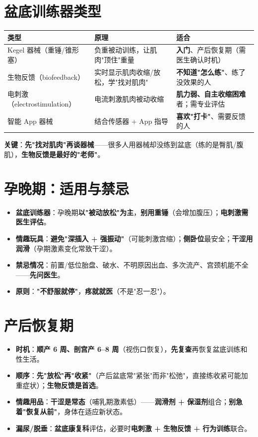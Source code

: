 \section{盆底训练器类型}
\begin{tabularx}{\textwidth}{X X X}
\toprule
\textbf{类型} & \textbf{原理} & \textbf{适合} \\
\midrule
Kegel 器械（重锤/锥形塞） & 负重被动训练，让肌肉"顶住"重量 & \textbf{入门}、产后恢复期（需医生确认时机） \\
生物反馈（biofeedback） & 实时显示肌肉收缩/放松，学"找对肌肉" & \textbf{不知道"怎么练"}、练了没效果的人 \\
电刺激（electrostimulation） & 电流刺激肌肉被动收缩 & \textbf{肌力弱、自主收缩困难}者；需专业评估 \\
智能 App 器械 & 结合传感器 + App 指导 & \textbf{喜欢"打卡"}、需要反馈的人 \\
\bottomrule
\end{tabularx}
\par\smallskip
\textbf{关键}：\textbf{先"找对肌肉"再谈器械}——很多人用器械却没练到盆底（练的是臀肌/腹肌），\textbf{生物反馈是最好的"老师"}。

\section{孕晚期：适用与禁忌}
\begin{itemize}[leftmargin=2em,itemsep=0.3em]
  \item \textbf{盆底训练器}：孕晚期\textbf{以"被动放松"为主}，\textbf{别用重锤}（会增加腹压）；\textbf{电刺激需医生评估}。
  \item \textbf{情趣玩具}：\textbf{避免"深插入 + 强振动"}（可能刺激宫缩）；\textbf{侧卧位}最安全；\textbf{干涩用润滑}（孕期激素变化常致干涩）。
  \item \textbf{禁忌情况}：前置/低位胎盘、破水、不明原因出血、多次流产、宫颈机能不全——\textbf{先问医生}。
  \item \textbf{原则}：\textbf{"不舒服就停"}，\textbf{疼就就医}（不是"忍一忍"）。
\end{itemize}

\section{产后恢复期}
\begin{itemize}[leftmargin=2em,itemsep=0.3em]
  \item \textbf{时机}：\textbf{顺产 6 周、剖宫产 6--8 周}（视伤口恢复），\textbf{先复查}再恢复盆底训练和性生活。
  \item \textbf{顺序}：\textbf{先"放松"再"收紧"}（产后盆底常"紧张"而非"松弛"，直接练收紧可能加重症状）；\textbf{生物反馈是首选}。
  \item \textbf{情趣用品}：\textbf{干涩是常态}（哺乳期激素低）——\textbf{润滑剂 + 保湿剂}组合；\textbf{别急着"恢复从前"}，身体在适应新状态。
  \item \textbf{漏尿/脱垂}：\textbf{盆底康复科}评估，必要时\textbf{电刺激 + 生物反馈 + 行为训练}联合。
\end{itemize}

